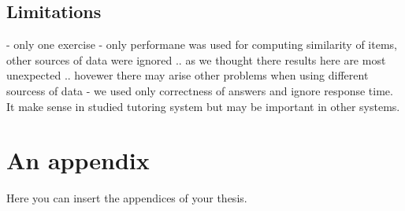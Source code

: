 \documentclass[
  digital, %
  table,   %
  nolof,     %
  nolot,     %
  nocover
]{fithesis3}
\begin{document}


\section{Limitations}\label{limitations}

- only one exercise
- only performane was used for computing similarity of items, other sources of data were ignored .. as we thought there results here are most unexpected .. hovewer there may arise other problems when using different sourcess of data
- we used only correctness of answers and ignore response time. It make sense in studied tutoring system but may be important in other systems.


  \makeatletter\thesis@blocks@clear\makeatother

\appendix %
\chapter{An appendix}
Here you can insert the appendices of your thesis.
\end{document}

